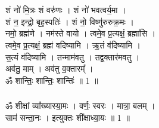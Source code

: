 \section{}
\subsection{}
शं नो॑ मि॒त्रः शं वरु॑णः । शं नो॑ भवत्वर्य॒मा ।\\
शं न॒ इन्द्रो॒ बृह॒स्पतिः॑ । शं नो॒ विष्णु॑रुरुक्र॒मः ।\\
नमो॒ ब्रह्म॑णे । नम॑स्ते वायो । त्वमे॒व प्र॒त्यक्षं॒ ब्रह्मा॑सि ।\\
त्वमे॒व प्र॒त्यक्षं॒ ब्रह्म॑ वदिष्यामि । ऋ॒तं व॑दिष्यामि ।\\
स॒त्यं व॑दिष्यामि । तन्माम॑वतु । तद्व॒क्तार॑मवतु ।\\
अव॑तु॒ माम् । अव॑तु व॒क्तारम्᳚ ।\\
ॐ शान्तिः॒ शान्तिः॒ शान्तिः॑ ॥ 1 ॥\\
\subsubsection{}
{\small ॐ} शीक्षां व्या᳚ख्यास्या॒मः । वर्णः॒ स्वरः । मात्रा॒ बलम् ।\\
साम॑ सन्ता॒नः । इत्युक्तः शी᳚क्षाध्या॒यः ॥ 1 ॥\\
